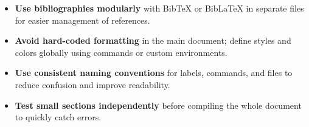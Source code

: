\documentclass[../../main.tex]{subfiles}
\begin{document}
\begin{itemize}
    \item \textbf{Use bibliographies modularly} with BibTeX or BibLaTeX in separate files for easier management of references.
    
    \item \textbf{Avoid hard-coded formatting} in the main document; define styles and colors globally using commands or custom environments.
    
    \item \textbf{Use consistent naming conventions} for labels, commands, and files to reduce confusion and improve readability.
    
    \item \textbf{Test small sections independently} before compiling the whole document to quickly catch errors.
\end{itemize}

\clearpage
\end{document}
